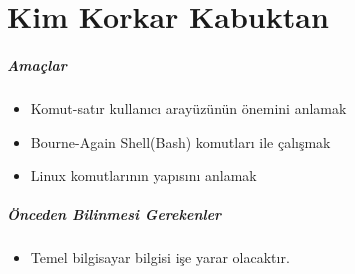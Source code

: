 \documentclass[10pt,a5paper]{book}
\begin{document}
\chapter{Kim Korkar Kabuktan}
\paragraph{Amaçlar}
\begin{itemize}
 \item Komut-satır kullanıcı arayüzünün önemini anlamak
 \item Bourne-Again Shell(Bash) komutları ile çalışmak
 \item Linux komutlarının yapısını anlamak
 \end{itemize}
 
\paragraph{Önceden Bilinmesi Gerekenler}
\begin{itemize}
 \item Temel bilgisayar bilgisi işe yarar olacaktır.
 \end{itemize}
\end{document}
